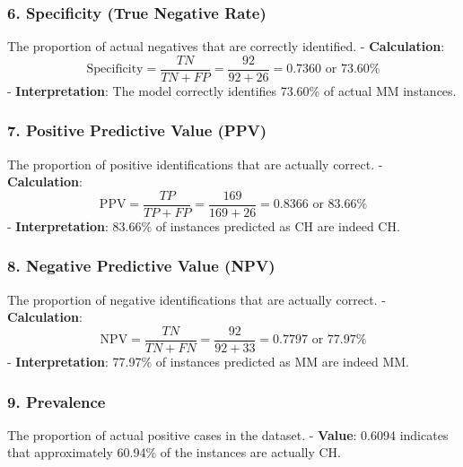 \documentclass[
]{article}
\begin{document}
\hypertarget{specificity-true-negative-rate}{%
\subsubsection{\texorpdfstring{6. \textbf{Specificity (True Negative
Rate)}}{6. Specificity (True Negative Rate)}}\label{specificity-true-negative-rate}}

The proportion of actual negatives that are correctly identified. -
\textbf{Calculation}: \[
  \text{Specificity} = \frac{TN}{TN + FP} = \frac{92}{92 + 26} = 0.7360 \text{ or } 73.60\%
  \] - \textbf{Interpretation}: The model correctly identifies 73.60\%
of actual MM instances.

\hypertarget{positive-predictive-value-ppv}{%
\subsubsection{\texorpdfstring{7. \textbf{Positive Predictive Value
(PPV)}}{7. Positive Predictive Value (PPV)}}\label{positive-predictive-value-ppv}}

The proportion of positive identifications that are actually correct. -
\textbf{Calculation}: \[
  \text{PPV} = \frac{TP}{TP + FP} = \frac{169}{169 + 26} = 0.8366 \text{ or } 83.66\%
  \] - \textbf{Interpretation}: 83.66\% of instances predicted as CH are
indeed CH.

\hypertarget{negative-predictive-value-npv}{%
\subsubsection{\texorpdfstring{8. \textbf{Negative Predictive Value
(NPV)}}{8. Negative Predictive Value (NPV)}}\label{negative-predictive-value-npv}}

The proportion of negative identifications that are actually correct. -
\textbf{Calculation}: \[
  \text{NPV} = \frac{TN}{TN + FN} = \frac{92}{92 + 33} = 0.7797 \text{ or } 77.97\%
  \] - \textbf{Interpretation}: 77.97\% of instances predicted as MM are
indeed MM.

\hypertarget{prevalence}{%
\subsubsection{\texorpdfstring{9.
\textbf{Prevalence}}{9. Prevalence}}\label{prevalence}}

The proportion of actual positive cases in the dataset. -
\textbf{Value}: 0.6094 indicates that approximately 60.94\% of the
instances are actually CH.
\end{document}
